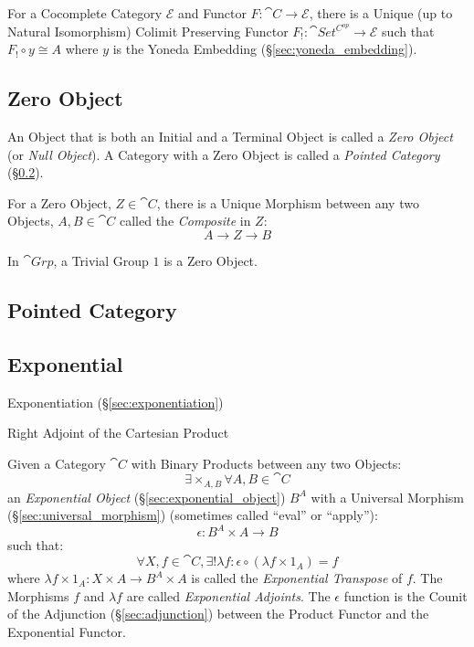 For a Cocomplete Category $\mathcal{E}$ and Functor $F : \cat{C}
\rightarrow \mathcal{E}$, there is a Unique (up to Natural
Isomorphism) Colimit Preserving Functor $F_! : \cat{Set^{C^{op}}}
\rightarrow \mathcal{E}$ such that $F_! \circ y \cong A$ where $y$ is
the Yoneda Embedding (\S\ref{sec:yoneda_embedding}).\cite{awodey06}



\subsection{Zero Object}\label{sec:zero_object}

An Object that is both an Initial and a Terminal Object is called a
\emph{Zero Object} (or \emph{Null Object}). A Category with a Zero
Object is called a \emph{Pointed Category}
(\S\ref{sec:pointed_category}).

For a Zero Object, $Z \in \cat{C}$, there is a Unique Morphism
between any two Objects, $A, B \in \cat{C}$ called the
\emph{Composite} in $Z$:
\[
  A \rightarrow Z \rightarrow B
\]

In $\cat{Grp}$, a Trivial Group ${1}$ is a Zero Object.



\subsection{Pointed Category}\label{sec:pointed_category}



\subsection{Exponential}\label{sec:category_exponential}

\fist Exponentiation (\S\ref{sec:exponentiation})

Right Adjoint of the Cartesian Product

Given a Category $\cat{C}$ with Binary Products between any two
Objects:
\[
  \exists \times_{A,B} \forall A,B \in \cat{C}
\]
an \emph{Exponential Object} (\S\ref{sec:exponential_object}) $B^A$
with a Universal Morphism (\S\ref{sec:universal_morphism}) (sometimes
called ``eval'' or ``apply''):
\[
  \epsilon : B^A \times A \rightarrow B
\]
such that:
\[
  \forall X, f \in \cat{C}, \exists ! \lambda f :
  \epsilon \circ (\lambda f \times 1_A) = f
\]
where $\lambda f \times 1_A : X \times A \rightarrow B^A \times A$ is
called the \emph{Exponential Transpose} of $f$. The Morphisms $f$ and
$\lambda f$ are called \emph{Exponential Adjoints}. The $\epsilon$
function is the Counit of the Adjunction (\S\ref{sec:adjunction}) between
the Product Functor and the Exponential Functor.


